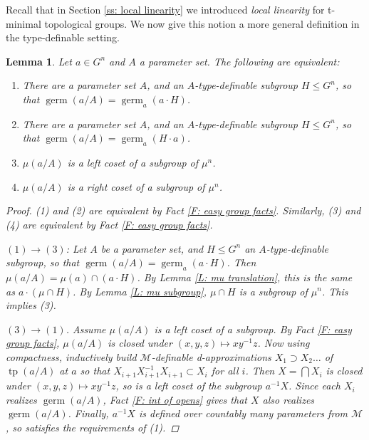 \documentclass{amsart}
\newtheorem{lemma}[theorem]{Lemma}
\theoremstyle{definition}
\newcommand{\tp}{\operatorname{tp}}
\begin{document}
Recall that in Section \ref{ss: local linearity} we introduced \textit{local linearity} for t-minimal topological groups. We now give this notion a more general definition in the type-definable setting.

\begin{lemma}\label{L: loc lin char}
    Let $a\in G^n$ and $A$ a parameter set. The following are equivalent:
    \begin{enumerate}
        \item There are a parameter set $A$, and an $A$-type-definable subgroup $H\leq G^n$, so that $\operatorname{germ}(a/A)=\operatorname{germ}_a(a\cdot H)$.
        \item There are a parameter set $A$, and an $A$-type-definable subgroup $H\leq G^n$, so that $\operatorname{germ}(a/A)=\operatorname{germ}_a(H\cdot a)$.
        \item $\mu(a/A)$ is a left coset of a subgroup of $\mu^n$.
        \item $\mu(a/A)$ is a right coset of a subgroup of $\mu^n$.
    \end{enumerate}
    \begin{proof}
        (1) and (2) are equivalent by Fact \ref{F: easy group facts}. Similarly, (3) and (4) are equivalent by Fact \ref{F: easy group facts}.

        $(1)\rightarrow(3)$: Let $A$ be a parameter set, and $H\leq G^n$ an $A$-type-definable subgroup, so that $\operatorname{germ}(a/A)=\operatorname{germ}_a(a\cdot H)$. Then $\mu(a/A)=\mu(a)\cap(a\cdot H)$. By Lemma \ref{L: mu translation}, this is the same as $a\cdot(\mu\cap H)$. By Lemma \ref{L: mu subgroup}, $\mu\cap H$ is a subgroup of $\mu^n$. This implies (3).
        
        $(3)\rightarrow(1)$. Assume $\mu(a/A)$ is a left coset of a subgroup. By Fact \ref{F: easy group facts}, $\mu(a/A)$ is closed under $(x,y,z)\mapsto xy^{-1}z$. Now using compactness, inductively build $\mathcal M$-definable d-approximations $X_1\supset X_2\dots$ of $\tp(a/A)$ at $a$ so that $X_{i+1}X_{i+1}^{-1}X_{i+1}\subset X_i$ for all $i$. Then $X=\bigcap X_i$ is closed under $(x,y,z)\mapsto xy^{-1}z$, so is a left coset of the subgroup $a^{-1}X$. Since each $X_i$ realizes $\operatorname{germ}(a/A)$, Fact \ref{F: int of opens} gives that $X$ also realizes $\operatorname{germ}(a/A)$. Finally, $a^{-1}X$ is defined over countably many parameters from $\mathcal M$, so satisfies the requirements of (1).
    \end{proof}
    \end{lemma}
\end{document}
